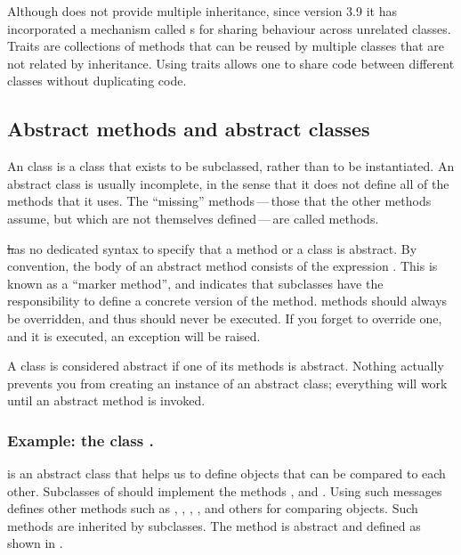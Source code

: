 \documentclass[a4paper,10pt,twoside]{book}
\begin{document}

Although \pharo does not provide multiple inheritance, since version 3.9 it has incorporated a mechanism called s for sharing behaviour across unrelated classes.
Traits are collections of methods that can be reused by multiple classes that are not related by inheritance. Using traits allows one to share code between different classes without duplicating code.

\subsection{Abstract methods and abstract classes}

An  class is a class that exists to be subclassed, rather than to be instantiated.
An abstract class is usually incomplete, in the sense that it does not define all of the methods that it uses.
The ``missing'' methods\,---\,those that the other methods assume, but which are not themselves defined\,---\,are called  methods.

\st has no dedicated syntax to specify that a method or a class is abstract. 
By convention, the body of an abstract method consists of the expression \mbox{.} 
This is known as a ``marker method'', and indicates that subclasses have the responsibility to define a concrete version of the method. 
 methods should always be overridden, and thus should never be executed.
If you forget to override one, and it is executed, an exception will be raised. 

A class is considered abstract if one of its methods is abstract.
Nothing actually prevents you from creating an instance of an abstract class; everything will work until an abstract method is invoked. 

\subsubsection{Example: the class .}
 is an abstract class that helps us to  define objects that can be compared to each other. Subclasses of  should implement the methods \ct{<}, \ct{=} and . Using such messages  defines other methods such as \ct{>}, \ct{>=}, \ct{<=}, ,   and others for comparing objects. Such methods are inherited by subclasses. The method  is abstract and defined as shown in .
\end{document}
